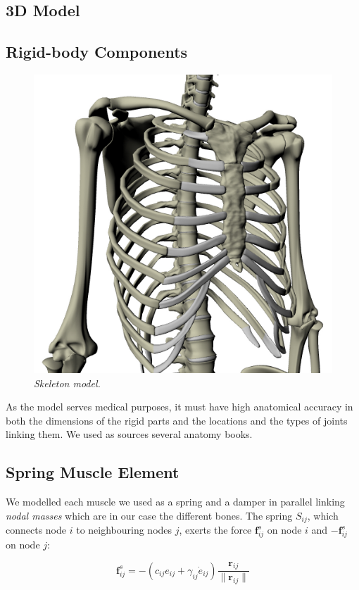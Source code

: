 \documentclass[boxedsections ,landscape, a0]{sciposter_v2}
\begin{document}
\begin{multicols}{4}
\section{3D Model}


\subsection{Rigid-body Components}


\begin{figure}
\vspace{-2.5\bigskipamount}
  \begin{center}
    \includegraphics[width=0.3\columnwidth]{imgs/skeleton}
     \emph{Skeleton model.}
     
  \end{center}
  \vspace{-\bigskipamount}
 \end{figure}


As the model serves medical purposes, it must have high anatomical accuracy in both the dimensions of the rigid parts and the locations and the types of joints linking them. 
We used as sources several anatomy books.

\vspace{0.5\bigskipamount}

\subsection{Spring Muscle Element}
We modelled each muscle we used as a spring and a damper in parallel linking \emph{nodal masses} which are in our case the different bones. The spring $ S_{ij} $, which connects node $ i $ to neighbouring nodes $ j $, exerts the force $ \mathbf{f}_{ij}^s $ on node $ i $ and $ - \mathbf{f}_{ij}^s $ on node $ j $:

\begin{equation} \label{eq:spring_muscle} \mathbf{f}_{ij}^s = -( c_{ij} e_{ij} + \gamma_{ij} \dot{e}_{ij} ) \frac{\mathbf{r}_{ij}}{\lVert \mathbf{r}_{ij} \rVert} \end{equation}


\end{multicols}
\end{document}
